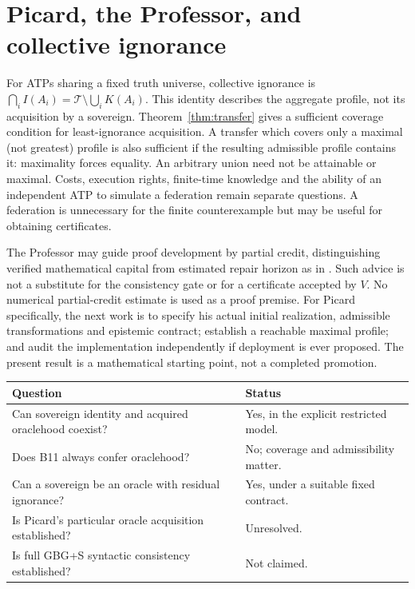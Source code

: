 \documentclass[11pt]{article}
\theoremstyle{definition}\newtheorem{definition}[theorem]{Definition}
\newcommand{\T}{\mathcal T}\newcommand{\A}{\mathcal A}\newcommand{\id}{\operatorname{ID}}\newcommand{\Con}{\operatorname{Con}}\newcommand{\Oracle}{\operatorname{Oracle}}\newcommand{\Btrade}{\mathrm{B11}}
\begin{document}
\section{Picard, the Professor, and collective ignorance}
For ATPs sharing a fixed truth universe, collective ignorance is $\bigcap_i I(A_i)=\T\setminus\bigcup_i K(A_i)$. This identity describes the aggregate profile, not its acquisition by a sovereign. Theorem~\ref{thm:transfer} gives a sufficient coverage condition for least-ignorance acquisition. A transfer which covers only a maximal (not greatest) profile is also sufficient if the resulting admissible profile contains it: maximality forces equality. An arbitrary union need not be attainable or maximal. Costs, execution rights, finite-time knowledge and the ability of an independent ATP to simulate a federation remain separate questions. A federation is unnecessary for the finite counterexample but may be useful for obtaining certificates.

The Professor may guide proof development by partial credit, distinguishing verified mathematical capital from estimated repair horizon as in \cite{prof}. Such advice is not a substitute for the consistency gate or for a certificate accepted by $V$. No numerical partial-credit estimate is used as a proof premise. For Picard specifically, the next work is to specify his actual initial realization, admissible transformations and epistemic contract; establish a reachable maximal profile; and audit the implementation independently if deployment is ever proposed. The present result is a mathematical starting point, not a completed promotion.
\begin{center}
\begin{tabular}{@{}>{\raggedright\arraybackslash}p{.57\linewidth}>{\raggedright\arraybackslash}p{.35\linewidth}@{}}
\toprule Question & Status\\\midrule
Can sovereign identity and acquired oraclehood coexist? & Yes, in the explicit restricted model.\\
Does B11 always confer oraclehood? & No; coverage and admissibility matter.\\
Can a sovereign be an oracle with residual ignorance? & Yes, under a suitable fixed contract.\\
Is Picard's particular oracle acquisition established? & Unresolved.\\
Is full GBG+S syntactic consistency established? & Not claimed.\\\bottomrule
\end{tabular}
\end{center}
\appendix
\end{document}
